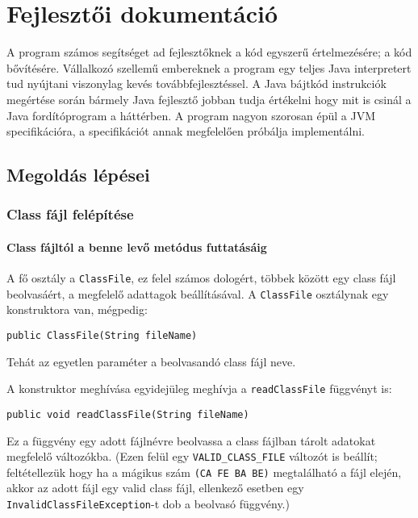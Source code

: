 \chapter{Fejlesztői dokumentáció}
\label{ch:impl}

A program számos segítséget ad fejlesztőknek a kód egyszerű értelmezésére; a kód bővítésére. Vállalkozó szellemű embereknek a program egy teljes Java interpretert tud nyújtani viszonylag kevés továbbfejlesztéssel. A Java bájtkód instrukciók megértése során bármely Java fejlesztő jobban tudja értékelni hogy mit is csinál a Java fordítóprogram a háttérben. A program nagyon szorosan épül a JVM specifikációra, a specifikációt annak megfelelően próbálja implementálni.

\section{Megoldás lépései}

\subsection{Class fájl felépítése}

\subsubsection{Class fájltól a benne levő metódus futtatásáig}

A fő osztály a \lstinline{ClassFile}, ez felel számos dologért, többek között egy class fájl beolvasáért, a megfelelő adattagok beállításával. A \lstinline{ClassFile} osztálynak egy konstruktora van, mégpedig:
\begin{verbatim}
public ClassFile(String fileName)
\end{verbatim}
Tehát az egyetlen paraméter a beolvasandó class fájl neve.

A konstruktor meghívása egyidejüleg meghívja a \lstinline{readClassFile} függvényt is:
\begin{verbatim}
public void readClassFile(String fileName)
\end{verbatim}
Ez a függvény egy adott fájlnévre beolvassa a class fájlban tárolt adatokat megfelelő változókba.
(Ezen felül egy \lstinline{VALID_CLASS_FILE} változót is beállít; feltétellezük hogy ha a mágikus szám \lstinline{(CA FE BA BE)} megtalálható a fájl elején, akkor az adott fájl egy valid class fájl, ellenkező esetben egy \lstinline{InvalidClassFileException}-t dob a beolvasó függvény.)


